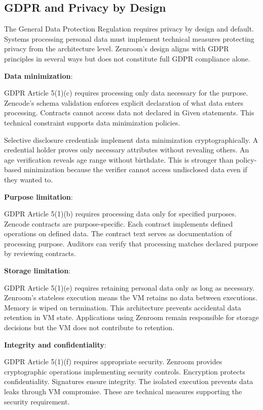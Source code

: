 \subsection{GDPR and Privacy by Design}

The General Data Protection Regulation requires privacy by design and
default. Systems processing personal data must implement technical
measures protecting privacy from the architecture level. Zenroom's
design aligns with GDPR principles in several ways but does not
constitute full GDPR compliance alone.

\textbf{Data minimization}:

GDPR Article 5(1)(c) requires processing only data necessary for the
purpose. Zencode's schema validation enforces explicit declaration of
what data enters processing. Contracts cannot access data not declared
in Given statements. This technical constraint supports data
minimization policies.

Selective disclosure credentials implement data minimization
cryptographically. A credential holder proves only necessary
attributes without revealing others. An age verification reveals age
range without birthdate. This is stronger than policy-based
minimization because the verifier cannot access undisclosed data even
if they wanted to.

\textbf{Purpose limitation}:

GDPR Article 5(1)(b) requires processing data only for specified
purposes. Zencode contracts are purpose-specific. Each contract
implements defined operations on defined data. The contract text
serves as documentation of processing purpose. Auditors can verify
that processing matches declared purpose by reviewing contracts.

\textbf{Storage limitation}:

GDPR Article 5(1)(e) requires retaining personal data only as long as
necessary. Zenroom's stateless execution means the VM retains no data
between executions. Memory is wiped on termination. This architecture
prevents accidental data retention in VM state. Applications using
Zenroom remain responsible for storage decisions but the VM does not
contribute to retention.

\textbf{Integrity and confidentiality}:

GDPR Article 5(1)(f) requires appropriate security. Zenroom provides
cryptographic operations implementing security controls. Encryption
protects confidentiality. Signatures ensure integrity. The isolated
execution prevents data leaks through VM compromise. These are
technical measures supporting the security requirement.

